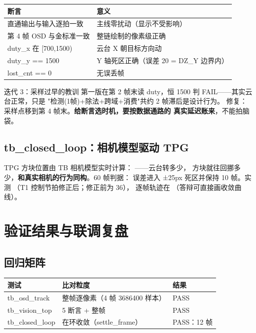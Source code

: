 \begin{center}
\begin{tabular}{ll}
\toprule
\rowcolor{rowtint}\textbf{断言} & \textbf{意义} \\
\midrule
直通输出与输入逐拍一致 & 主线零扰动（显示不受影响） \\
第 4 帧 OSD 与金标准一致 & 整链绘制的像素级正确 \\
duty\_x 在 [700,1500) & 云台 X 朝目标方向动 \\
duty\_y == 1500 & Y 轴死区正确（误差 20 = DZ\_Y 边界内） \\
lost\_cnt == 0 & 无误丢帧 \\
\bottomrule
\end{tabular}
\end{center}

\begin{warnbox}{迭代 3：采样过早的教训}
第一版在第 2 帧末读 duty，恒 1500 判 FAIL——其实云台正常，只是
"检测(1帧)+除法+跨域+消费"共约 2 帧滞后是设计行为。
修复：采样点移到第 4 帧末。\textbf{给断言选时机，要按数据通路的
真实延迟账来}，不能拍脑袋。
\end{warnbox}

\subsection{tb\_closed\_loop：相机模型驱动 TPG}

TPG 方块位置由 TB 相机模型实时计算：
——云台转多少，
方块就往回挪多少，\textbf{和真实相机的行为同构}。60 帧判据：
误差进入 ±25px 死区并保持 10 帧。实测 
（T1 控制节拍修正后；修正前为 36），
逐帧轨迹在 （答辩可直接画收敛曲线）。

\section{验证结果与联调复盘}

\subsection{回归矩阵}

\begin{center}
\begin{tabular}{lll}
\toprule
\rowcolor{rowtint}\textbf{测试} & \textbf{比对粒度} & \textbf{结果} \\
\midrule
tb\_osd\_track & 整帧逐像素（4 帧 3686400 样本） & PASS \\
tb\_vision\_top & 5 断言 + 整帧 & PASS \\
tb\_closed\_loop & 在环收敛（settle\_frame） & PASS：12 帧 \\
\bottomrule
\end{tabular}
\end{center}

